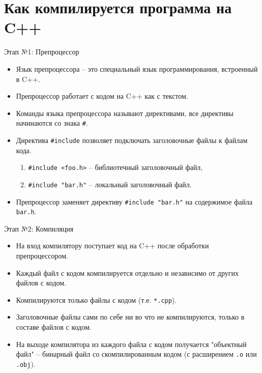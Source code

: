 \documentclass[
    9pt,
    hyperref={pdfencoding=unicode}
    ]{beamer}
\begin{document}
\section{Как компилируется программа на C++}
\begin{frame}[fragile]{Этап №1: Препроцессор}
    \begin{itemize}
        \item Язык препроцессора -- это специальный язык программирования, встроенный в C++.
        \item Препроцессор работает с кодом на C++ как с текстом.
        \item Команды языка препроцессора называют директивами, все директивы начинаются со знака \texttt{#}.
        \item Директива \texttt{#include} позволяет подключать заголовочные файлы к файлам кода.
        \begin{enumerate}
            \item \texttt{#include <foo.h>} -- библиотечный заголовочный файл,
            \item \texttt{#include "bar.h"} -- локальный заголовочный файл.
        \end{enumerate}
        \item Препроцессор заменяет директиву \texttt{#include "bar.h"} на содержимое файла \texttt{bar.h}.
    \end{itemize}
\end{frame}

\begin{frame}{Этап №2: Компиляция}
    \begin{itemize}
        \item На вход компилятору поступает код на C++ после обработки препроцессором.
        \item Каждый файл с кодом компилируется отдельно и независимо от других файлов с кодом.
        \item Компилируются только файлы с кодом (т.е. \texttt{*.cpp}).
        \item Заголовочные файлы сами по себе ни во что не компилируются, только в составе файлов с кодом.
        \item На выходе компилятора из каждого файла с кодом получается "объектный файл" -- бинарный файл со скомпилированным кодом (с расширением \texttt{.o} или \texttt{.obj}).
    \end{itemize}
\end{frame}
\end{document}
